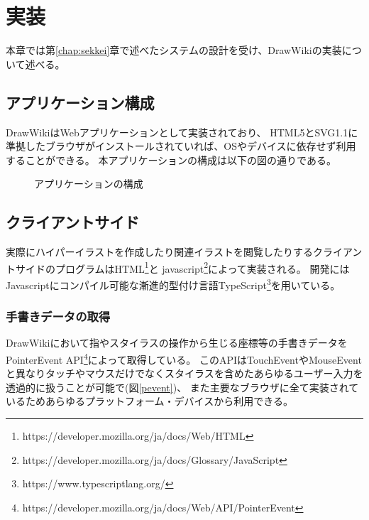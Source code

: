\chapter{実装}
\label{chap:jissou}

本章では第\ref{chap:sekkei}章で述べたシステムの設計を受け、DrawWikiの実装について述べる。

\newpage

\section{アプリケーション構成}
DrawWikiはWebアプリケーションとして実装されており、
HTML5とSVG1.1に準拠したブラウザがインストールされていれば、OSやデバイスに依存せず利用することができる。
本アプリケーションの構成は以下の図の通りである。

\begin{figure}[htbp]
    \begin{center}
         \end{center}
    \caption{アプリケーションの構成}
\end{figure}

\section{クライアントサイド}
実際にハイパーイラストを作成したり関連イラストを閲覧したりするクライアントサイドのプログラムはHTML\footnote{https://developer.mozilla.org/ja/docs/Web/HTML}と
javascript\footnote{https://developer.mozilla.org/ja/docs/Glossary/JavaScript}によって実装される。
開発にはJavascriptにコンパイル可能な漸進的型付け言語TypeScript\footnote{https://www.typescriptlang.org/}を用いている。

\subsection{手書きデータの取得}
DrawWikiにおいて指やスタイラスの操作から生じる座標等の手書きデータをPointerEvent API\footnote{https://developer.mozilla.org/ja/docs/Web/API/PointerEvent}によって取得している。
このAPIはTouchEventやMouseEventと異なりタッチやマウスだけでなくスタイラスを含めたあらゆるユーザー入力を透過的に扱うことが可能で(図\ref{pevent})、
また主要なブラウザに全て実装されているためあらゆるプラットフォーム・デバイスから利用できる。

